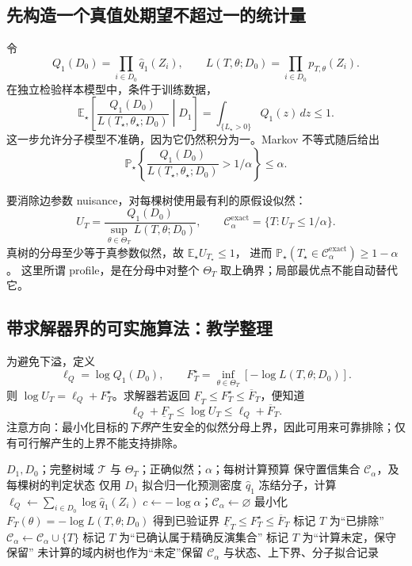\subsection{先构造一个真值处期望不超过一的统计量}

令
\[
 Q_1(D_0)=\prod_{i\in D_0}\widehat q_1(Z_i),\qquad
 L(T,\theta;D_0)=\prod_{i\in D_0}p_{T,\theta}(Z_i).
\]
在独立检验样本模型中，条件于训练数据，
\[
 \mathbb E_\star\!\left[
 \frac{Q_1(D_0)}{L(T_\star,\theta_\star;D_0)}\middle|D_1
 \right]
 =\int_{\{L_\star>0\}}Q_1(z)\,dz\le1.
\]
这一步允许分子模型不准确，因为它仍然积分为一。Markov 不等式随后给出
\[
 \mathbb P_\star\left\{
 \frac{Q_1(D_0)}{L(T_\star,\theta_\star;D_0)}>1/\alpha
 \right\}\le\alpha.
\]

要消除边参数 nuisance，对每棵树使用最有利的原假设似然：
\begin{equation}
 U_T=\frac{Q_1(D_0)}{\sup_{\theta\in\Theta_T}L(T,\theta;D_0)},
 \qquad
 \mathcal C_\alpha^{\mathrm{exact}}=\{T:U_T\le1/\alpha\}.
 \label{eq:textbook-S15-profile}
\end{equation}
真树的分母至少等于真参数似然，故 $\mathbb E_\star U_{T_\star}\le1$，
进而 $\mathbb P_\star(T_\star\in\mathcal C_\alpha^{\mathrm{exact}})\ge1-\alpha$。
这里所谓 profile，是在分母中对整个 $\Theta_T$ 取上确界；局部最优点不能自动替代它。

\subsection{带求解器界的可实施算法：教学整理}

为避免下溢，定义
\[
 \ell_Q=\log Q_1(D_0),\qquad
 F_T^\star=\inf_{\theta\in\Theta_T}[-\log L(T,\theta;D_0)].
\]
则 $\log U_T=\ell_Q+F_T^\star$。求解器若返回
$\underline F_T\le F_T^\star\le\overline F_T$，便知道
\[
 \ell_Q+\underline F_T\le\log U_T
 \le\ell_Q+\overline F_T.
\]
注意方向：最小化目标的\emph{下界}产生安全的似然分母上界，因此可用来可靠排除；仅有可行解产生的上界不能支持排除。

\begin{algorithm}[htbp]
\caption{S15：逐树 profile 检验，数值未定时保守保留（教学整理）}
\label{alg:textbook-S15}
\begin{algorithmic}[1]
\Require $D_1,D_0$；完整树域 $\mathcal T$ 与 $\Theta_T$；正确似然；$\alpha$；每树计算预算
\Ensure 保守置信集合 $\mathcal C_\alpha$，及每棵树的判定状态
\State 仅用 $D_1$ 拟合归一化预测密度 $\widehat q_1$
\State 冻结分子，计算 $\ell_Q\gets\sum_{i\in D_0}\log\widehat q_1(Z_i)$
\State $c\gets-\log\alpha$；$\mathcal C_\alpha\gets\varnothing$
  \State 最小化 $F_T(\theta)=-\log L(T,\theta;D_0)$
  \State 得到已验证界 $\underline F_T\le F_T^\star\le\overline F_T$
    \State 标记 $T$ 为“已排除”
  \Else
    \State $\mathcal C_\alpha\gets\mathcal C_\alpha\cup\{T\}$
      \State 标记 $T$ 为“已确认属于精确反演集合”
    \Else
      \State 标记 $T$ 为“计算未定，保守保留”
    \EndIf
  \EndIf
\EndFor
\State 未计算的域内树也作为“未定”保留
\State \Return $\mathcal C_\alpha$ 与状态、上下界、分子拟合记录
\end{algorithmic}
\end{algorithm}

